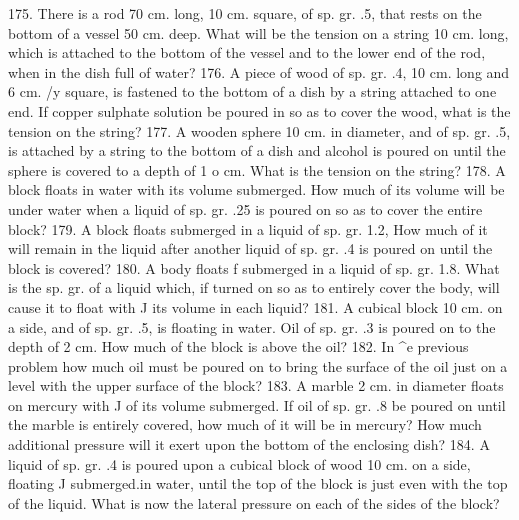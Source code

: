 175. There is a rod 70 cm. long, 10 cm. square, of sp. gr. .5, that rests on the bottom of a vessel 50 cm. deep. What will be the tension on a string 10 cm. long, which is attached to the bottom of the vessel and to the lower end of the rod, when in the dish full of water?
176. A piece of wood of sp. gr. .4, 10 cm. long and 6 cm. /y square, is fastened to the bottom of a dish by a string attached to one end. If copper sulphate solution be poured in so as to cover the wood, what is the tension on the string?
177. A wooden sphere 10 cm. in diameter, and of sp. gr. .5, is attached by a string to the bottom of a dish and alcohol is poured on until the sphere is covered to a depth of 1 o cm. What is the tension on the string?
178. A block floats in water with \frac{}{} its volume submerged. How much of its volume will be under water when a liquid of sp. gr. .25 is poured on so as to cover the entire block?
179. A block floats \frac{}{} submerged in a liquid of sp. gr. 1.2, How much of it will remain in the liquid after another liquid of sp. gr. .4 is poured on until the block is covered?
180. A body floats f submerged in a liquid of sp. gr. 1.8. What is the sp. gr. of a liquid which, if turned on so as to entirely cover the body, will cause it to float with J its volume in each liquid?
181. A cubical block 10 cm. on a side, and of sp. gr. .5, is floating in water. Oil of sp. gr. .3 is poured on to the depth of 2 cm. How much of the block is above the oil?
182. In ^e previous problem how much oil must be poured on to bring the surface of the oil just on a level with the upper surface of the block?
183. A marble 2 cm. in diameter floats on mercury with J of its volume submerged. If oil of sp. gr. .8 be poured on until the marble is entirely covered, how much of it will be in mercury? How much additional pressure will it exert upon the bottom of the enclosing dish?
184. A liquid of sp. gr. .4 is poured upon a cubical block of wood 10 cm. on a side, floating J submerged.in water, until the top of the block is just even with the top of the liquid. What is now the lateral pressure on each of the sides of the block?
